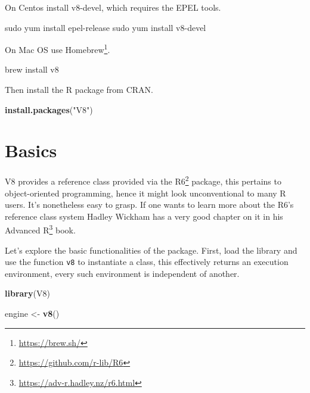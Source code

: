 \documentclass[
]{krantz}
\makeatletter
\newenvironment{Shaded}{\begin{snugshade}}{\end{snugshade}}
\newcommand{\ExtensionTok}[1]{#1}
\newcommand{\FunctionTok}[1]{\textcolor[rgb]{0,0,0}{#1}}
\newcommand{\KeywordTok}[1]{\textcolor[rgb]{0.27,0.27,0.27}{\textbf{#1}}}
\newcommand{\NormalTok}[1]{#1}
\newcommand{\StringTok}[1]{\textcolor[rgb]{0.5,0.5,0.5}{#1}}
\renewcommand{\href}[2]{#2\footnote{\url{#1}}}
\newenvironment{kframe}{%
\medskip{}
\setlength{\fboxsep}{.8em}
 \def\at@end@of@kframe{}%
 \ifinner\ifhmode%
  \def\at@end@of@kframe{\end{minipage}}%
  \begin{minipage}{\columnwidth}%
 \fi\fi%
 \def\FrameCommand##1{\hskip\@totalleftmargin \hskip-\fboxsep
 \colorbox{shadecolor}{##1}\hskip-\fboxsep
     \hskip-\linewidth \hskip-\@totalleftmargin \hskip\columnwidth}%
 \MakeFramed {\advance\hsize-\width
   \@totalleftmargin\z@ \linewidth\hsize
   \@setminipage}}%
 {\par\unskip\endMakeFramed%
 \at@end@of@kframe}
\renewenvironment{Shaded}{\begin{kframe}}{\end{kframe}}
\makeatother
\begin{document}
On Centos install v8-devel, which requires the EPEL tools.

\begin{Shaded}
\begin{Highlighting}[]
\FunctionTok{sudo}\NormalTok{ yum install epel{-}release}
\FunctionTok{sudo}\NormalTok{ yum install v8{-}devel}
\end{Highlighting}
\end{Shaded}

On Mac OS use \href{https://brew.sh/}{Homebrew}.

\begin{Shaded}
\begin{Highlighting}[]
\ExtensionTok{brew}\NormalTok{ install v8}
\end{Highlighting}
\end{Shaded}

Then install the R package from CRAN.

\begin{Shaded}
\begin{Highlighting}[]
\KeywordTok{install.packages}\NormalTok{(}\StringTok{"V8"}\NormalTok{)}
\end{Highlighting}
\end{Shaded}

\hypertarget{basics}{%
\section{Basics}\label{basics}}

V8 provides a reference class provided via the \href{https://github.com/r-lib/R6}{R6} \citep{R-R6} package, this pertains to object-oriented programming, hence it might look unconventional to many R users. It's nonetheless easy to grasp. If one wants to learn more about the R6's reference class system Hadley Wickham has a very good chapter on it in his \href{https://adv-r.hadley.nz/r6.html}{Advanced R} book.

Let's explore the basic functionalities of the package. First, load the library and use the function \texttt{v8} to instantiate a class, this effectively returns an execution environment, every such environment is independent of another.

\begin{Shaded}
\begin{Highlighting}[]
\KeywordTok{library}\NormalTok{(V8)}

\NormalTok{engine <{-}}\StringTok{ }\KeywordTok{v8}\NormalTok{()}
\end{Highlighting}
\end{Shaded}
\end{document}
